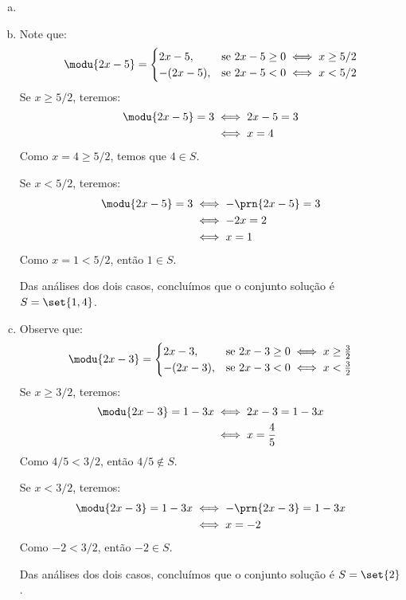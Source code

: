 \begin{solution}
\begin{enumerate}[(a)]
	\item[]
	\item Note que:
	\begin{align*}
		\modu{2x-5} = 
		\begin{cases}
		2x-5,    & \text{se } 2x-5 \ge 0 \iff x \ge 5/2 \\
		-(2x-5), & \text{se } 2x-5 < 0 \iff x < 5/2
		\end{cases}
	\end{align*}
	Se $x \ge 5/2$, teremos:
	\begin{align*}
	\modu{2x-5}=3 &\iff 2x-5=3 \\
				  &\iff x=4
	\end{align*}
	Como $x=4\ge5/2$, temos que $4 \in S$.

	Se $x<5/2$, teremos:
	\begin{align*}
		\modu{2x-5}=3 &\iff -\prn{2x-5}=3 \\
					  &\iff -2x=2 \\
					  &\iff x=1 
	\end{align*}
	Como $x=1<5/2$, então $1 \in S$.

	Das análises dos dois casos, concluímos que o conjunto solução é $S=\set{1,4}$.

	\item Observe que:
	\begin{align*}
		\modu{2x-3}= 
		\begin{cases}
			2x-3,    & \text{se } 2x-3 \ge 0 \iff x \ge \frac 3 2 \\
			-(2x-3), & \text{se } 2x-3 < 0 \iff x < \frac 3 2
		\end{cases}
	\end{align*}
	Se $x \ge 3/2$, teremos:
	\begin{align*}
		\modu{2x-3}=1-3x &\iff 2x-3=1-3x \\
						 &\iff x = \frac 4 5
	\end{align*}
	Como $4/5 < 3/2$, então $4/5 \notin S$.

	Se $x < 3/2$, teremos:
	\begin{align*}
		\modu{2x-3}=1-3x &\iff -\prn{2x-3}=1-3x \\
						 &\iff x = -2
	\end{align*}
	Como $-2 < 3/2$, então $-2 \in S$.

	Das análises dos dois casos, concluímos que o conjunto solução é $S=\set{2}$.


\end{enumerate}
\end{solution}
